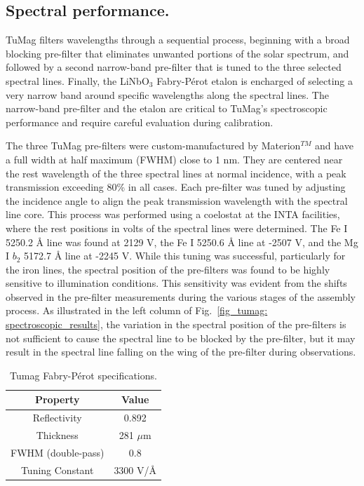 \subsection{Spectral performance.}

TuMag filters wavelengths through a sequential process, beginning with a broad blocking pre-filter that eliminates unwanted portions of the solar spectrum, and followed by a second narrow-band pre-filter that is tuned to the three selected spectral lines. Finally, the LiNbO$_3$ Fabry-Pérot etalon is encharged of selecting a very narrow band around specific wavelengths along the spectral lines. The narrow-band pre-filter and the etalon are critical to TuMag's spectroscopic performance and require careful evaluation during calibration.

The three TuMag pre-filters were custom-manufactured by Materion$^{TM}$ and have a full width at half maximum (FWHM) close to 1 nm. They are centered near the rest wavelength of the three spectral lines at normal incidence, with a peak transmission exceeding 80\% in all cases. Each pre-filter was tuned by adjusting the incidence angle to align the peak transmission wavelength with the spectral line core. This process was performed using a coelostat at the INTA facilities, where the rest positions in volts of the spectral lines were determined. The Fe I 5250.2 \r{A} line was found at 2129 V, the Fe I 5250.6 \r{A} line at -2507 V, and the Mg I $b_2$ 5172.7 \r{A} line at -2245 V. While this tuning was successful, particularly for the iron lines, the spectral position of the pre-filters was found to be highly sensitive to illumination conditions. This sensitivity was evident from the shifts observed in the pre-filter measurements during the various stages of the assembly process. As illustrated in the left column of Fig.~\ref{fig_tumag: spectroscopic_results}, the variation in the spectral position of the pre-filters is not sufficient to cause the spectral line to be blocked by the pre-filter, but it may result in the spectral line falling on the wing of the pre-filter during observations.

\begin{table}
    \centering
   \begin{tabular}{cc}
    \hline
    \hline
    Property & Value \\
    \hline
    Reflectivity & 0.892 \\
    Thickness & 281 $\mu$m\\
    FWHM (double-pass) & 0.8\\
    Tuning Constant & 3300 V/\r{A}\\
    \hline
    \hline
    \end{tabular}
    \caption{Tumag Fabry-Pérot specifications.}
    \label{table: Tumags etalon}
\end{table}


